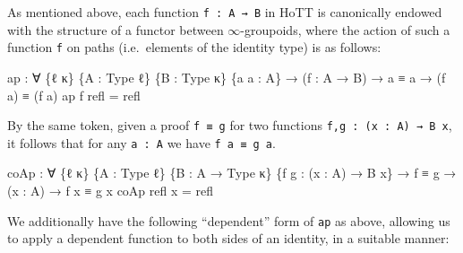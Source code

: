 \documentclass[
  11pt,
  oneside,
  article]{memoir}
\newenvironment{Shaded}{}{}
\newcommand{\NormalTok}[1]{#1}
\newcommand{\OtherTok}[1]{\textcolor[rgb]{0.00,0.44,0.13}{#1}}
\theoremstyle{definition}
\theoremstyle{plain}
\newcommand{\0}{\textsf{0}}
\newcommand{\1}{\tn{\textsf{1}}}
\begin{document}
As mentioned above, each function \texttt{f\ :\ A\ →\ B} in HoTT is
canonically endowed with the structure of a functor between
\(\infty\)-groupoids, where the action of such a function \texttt{f} on
paths (i.e.~elements of the identity type) is as follows:

\begin{Shaded}
\begin{Highlighting}[]
\NormalTok{ap }\OtherTok{:} \OtherTok{∀} \OtherTok{\{}\NormalTok{ℓ κ}\OtherTok{\}} \OtherTok{\{}\NormalTok{A }\OtherTok{:}\NormalTok{ Type ℓ}\OtherTok{\}} \OtherTok{\{}\NormalTok{B }\OtherTok{:}\NormalTok{ Type κ}\OtherTok{\}} \OtherTok{\{}\NormalTok{a a\textquotesingle{} }\OtherTok{:}\NormalTok{ A}\OtherTok{\}}
     \OtherTok{→} \OtherTok{(}\NormalTok{f }\OtherTok{:}\NormalTok{ A }\OtherTok{→}\NormalTok{ B}\OtherTok{)} \OtherTok{→}\NormalTok{ a ≡ a\textquotesingle{} }\OtherTok{→} \OtherTok{(}\NormalTok{f a}\OtherTok{)}\NormalTok{ ≡ }\OtherTok{(}\NormalTok{f a\textquotesingle{}}\OtherTok{)}
\NormalTok{ap f refl }\OtherTok{=}\NormalTok{ refl}
\end{Highlighting}
\end{Shaded}

By the same token, given a proof \texttt{f\ ≡\ g} for two functions
\texttt{f,g\ :\ (x\ :\ A)\ →\ B\ x}, it follows that for any
\texttt{a\ :\ A} we have \texttt{f\ a\ ≡\ g\ a}.

\begin{Shaded}
\begin{Highlighting}[]
\NormalTok{coAp }\OtherTok{:} \OtherTok{∀} \OtherTok{\{}\NormalTok{ℓ κ}\OtherTok{\}} \OtherTok{\{}\NormalTok{A }\OtherTok{:}\NormalTok{ Type ℓ}\OtherTok{\}} \OtherTok{\{}\NormalTok{B }\OtherTok{:}\NormalTok{ A }\OtherTok{→}\NormalTok{ Type κ}\OtherTok{\}} \OtherTok{\{}\NormalTok{f g }\OtherTok{:} \OtherTok{(}\NormalTok{x }\OtherTok{:}\NormalTok{ A}\OtherTok{)} \OtherTok{→}\NormalTok{ B x}\OtherTok{\}}
       \OtherTok{→}\NormalTok{ f ≡ g }\OtherTok{→} \OtherTok{(}\NormalTok{x }\OtherTok{:}\NormalTok{ A}\OtherTok{)} \OtherTok{→}\NormalTok{ f x ≡ g x}
\NormalTok{coAp refl x }\OtherTok{=}\NormalTok{ refl}
\end{Highlighting}
\end{Shaded}

We additionally have the following ``dependent'' form of \texttt{ap} as
above, allowing us to apply a dependent function to both sides of an
identity, in a suitable manner:
\end{document}
